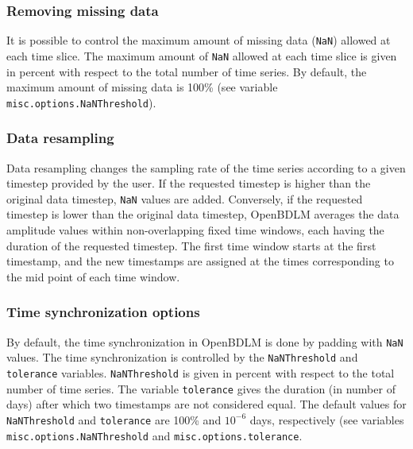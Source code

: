 \subsubsection{Removing missing data}
\label{SS:MissingDataRemoval}

It is possible to control the maximum amount of missing data (\lstinline[basicstyle = \mlttfamily \small ]!NaN!) allowed at each time slice. 
The maximum amount of \lstinline[basicstyle = \mlttfamily \small ]!NaN! allowed at each time slice is given in percent with respect to the total number of time series.
By default, the maximum amount of missing data is 100\% (see variable \lstinline[basicstyle = \mlttfamily \small ]!misc.options.NaNThreshold!).

\subsubsection{Data resampling}
\label{SS:DataResampling}
Data resampling changes the sampling rate of the time series according to a given timestep provided by the user. 
If the requested timestep is higher than the original data timestep, \lstinline[basicstyle = \mlttfamily \small ]!NaN! values are added.
Conversely, if the requested timestep is lower than the original  data timestep, OpenBDLM averages the data amplitude values within non-overlapping fixed time windows, each having the duration of the requested timestep.
The first time window starts at the first timestamp, and the new timestamps are assigned at the times corresponding to the mid point of each time window.

\subsubsection{Time synchronization options}
\label{SS:synchronization}
By default, the time synchronization in OpenBDLM is done by padding with \lstinline[basicstyle = \mlttfamily \small ]!NaN! values.
The time synchronization is controlled by the \lstinline[basicstyle = \mlttfamily \small ]!NaNThreshold! and \lstinline[basicstyle = \mlttfamily \small ]!tolerance! variables.
\lstinline[basicstyle = \mlttfamily \small ]!NaNThreshold!  is given in percent with respect to the total number of time series.
The variable \lstinline[basicstyle = \mlttfamily \small ]!tolerance! gives the duration (in number of days) after which two timestamps are not considered equal.
The default values for \lstinline[basicstyle = \mlttfamily \small ]!NaNThreshold!  and \lstinline[basicstyle = \mlttfamily \small ]!tolerance! are 100\% and $10^{-6}$ days, respectively (see variables \lstinline[basicstyle = \mlttfamily \small ]!misc.options.NaNThreshold! and \lstinline[basicstyle = \mlttfamily \small ]!misc.options.tolerance!. %

